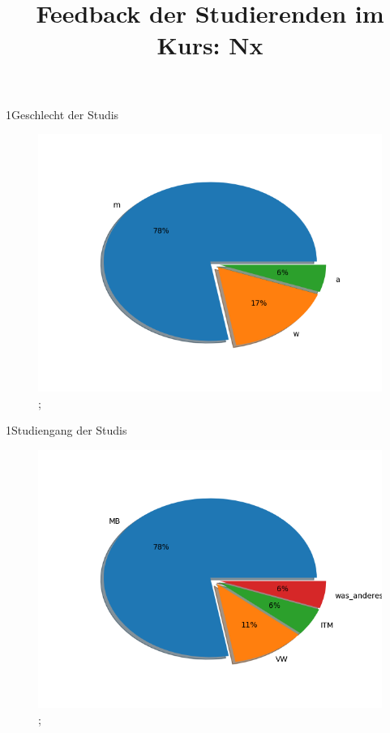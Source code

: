 \documentclass[10pt]{beamer}
\title{Feedback der Studierenden im Kurs: Nx }
\begin{document}
 
     \maketitle 
\begin{frame}[fragile]{1Geschlecht der Studis} 
 \begin{figure}
 \includegraphics[width= 0.9\linewidth]{./PDFcreater/Plots/Nx/1Geschlecht+der+Studis.png};
 \end{figure}
 \end{frame}
\begin{frame}[fragile]{1Studiengang der Studis} 
 \begin{figure}
 \includegraphics[width= 0.9\linewidth]{./PDFcreater/Plots/Nx/1Studiengang+der+Studis.png};
 \end{figure}
 \end{frame}
\end{document}
